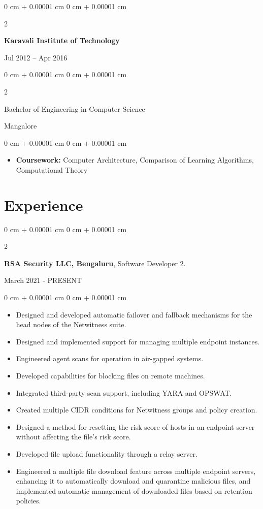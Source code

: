 \documentclass[10pt, letterpaper]{article}
\newenvironment{highlights}{
    \begin{itemize}[
        topsep=0.10 cm,
        parsep=0.10 cm,
        partopsep=0pt,
        itemsep=0pt,
        leftmargin=0 cm + 10pt
    ]
}{
    \end{itemize}
} %
\newenvironment{onecolentry}{
    \begin{adjustwidth}{
        0 cm + 0.00001 cm
    }{
        0 cm + 0.00001 cm
    }
}{
    \end{adjustwidth}
} %
\newenvironment{twocolentry}[2][]{
    \onecolentry
    \def\secondColumn{#2}
    \setcolumnwidth{\fill, 4.5 cm}
    \begin{paracol}{2}
}{
    \switchcolumn \raggedleft \secondColumn
    \end{paracol}
    \endonecolentry
} %
\begin{document}
        \begin{twocolentry}{Jul 2012 – Apr 2016}
            \textbf{Karavali Institute of Technology}
        \end{twocolentry}
        \begin{twocolentry}{Mangalore}
            Bachelor of Engineering in Computer Science
        \end{twocolentry}
        \begin{onecolentry}
            \begin{highlights}
                \item \textbf{Coursework:} Computer Architecture, Comparison of Learning Algorithms, Computational Theory
            \end{highlights}
        \end{onecolentry}
        
    \section{Experience}

        \begin{twocolentry}{March 2021 - PRESENT}
          \textbf{RSA Security LLC, Bengaluru}, Software Developer 2.
        \end{twocolentry}
        \vspace{0.10 cm}
        \begin{onecolentry}
            \begin{highlights}
                \item Designed and developed automatic failover and fallback mechanisms for the head nodes of the Netwitness suite.
                \item Designed and implemented support for managing multiple endpoint instances.
                \item Engineered agent scans for operation in air-gapped systems.
                \item Developed capabilities for blocking files on remote machines.
                \item Integrated third-party scan support, including YARA and OPSWAT.
               \item Created multiple CIDR conditions for Netwitness groups and policy creation.
              \item Designed a method for resetting the risk score of hosts in an endpoint server without affecting the file's risk score.
              \item Developed file upload functionality through a relay server.
              \item Engineered a multiple file download feature across multiple endpoint servers, enhancing it to automatically download and quarantine malicious files, and implemented automatic management of downloaded files based on retention policies.
            \end{highlights}
        \end{onecolentry}
\end{document}
